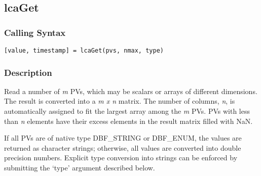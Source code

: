 \documentclass{article}
\newcommand{\NAN}{\mbox{NaN}}
\newcommand{\pbrk}{\pagebreak[3]}
\newcommand{\ita}[1]{\emph{#1}}
\newcommand{\m}{$m$}
\newcommand{\n}{$n$}
\newcommand{\mxn}{$m\times n$}
\renewcommand{\m}{\ita{m}}
\renewcommand{\n}{\ita{n}}
\renewcommand{\mxn}{\ita{m x n}}
\renewcommand{\pbrk}{}
\begin{document}
\vspace*{\fill}

\pbrk
\subsection{lcaGet}
\label{lcaget}
\subsubsection{Calling Syntax}
\begin{verbatim}
[value, timestamp] = lcaGet(pvs, nmax, type)
\end{verbatim}
\subsubsection{Description}
Read a number of \m{} PVs, which may be scalars or arrays of
different dimensions. The result is converted into a \mxn{}
matrix. The number of columns, \n, is automatically assigned
to fit the largest array among the \m{} PVs.  PVs with less than
\n{} elements have their excess elements in the result matrix
filled with \NAN.

If all PVs are of native type DBF\_STRING or DBF\_ENUM, the
values are returned as character strings; otherwise,
all values are converted into double precision numbers.
Explicit type conversion into strings can be enforced by submitting
the `type' argument described below.
\end{document}
